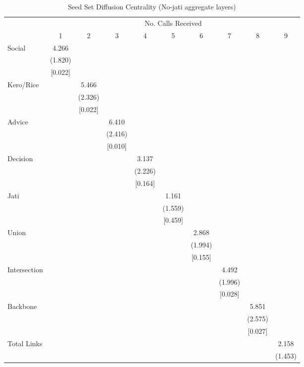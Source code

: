\begin{table}
\centering
\caption{Seed Set Diffusion Centrality (No-jati aggregate layers)}
\centering
\begin{tabular}[t]{lccccccccc}
\toprule
\multicolumn{1}{c}{ } & \multicolumn{9}{c}{No. Calls Received} \\
\cmidrule(l{3pt}r{3pt}){2-10}
  & 1 & 2 & 3 & 4 & 5 & 6 & 7 & 8 & 9\\
\midrule
Social & \num{4.266} &  &  &  &  &  &  &  & \\
 & (\num{1.820}) &  &  &  &  &  &  &  & \\
 & {}[\num{0.022}] &  &  &  &  &  &  &  & \\
Kero/Rice &  & \num{5.466} &  &  &  &  &  &  & \\
 &  & (\num{2.326}) &  &  &  &  &  &  & \\
 &  & {}[\num{0.022}] &  &  &  &  &  &  & \\
Advice &  &  & \num{6.410} &  &  &  &  &  & \\
 &  &  & (\num{2.416}) &  &  &  &  &  & \\
 &  &  & {}[\num{0.010}] &  &  &  &  &  & \\
Decision &  &  &  & \num{3.137} &  &  &  &  & \\
 &  &  &  & (\num{2.226}) &  &  &  &  & \\
 &  &  &  & {}[\num{0.164}] &  &  &  &  & \\
Jati &  &  &  &  & \num{1.161} &  &  &  & \\
 &  &  &  &  & (\num{1.559}) &  &  &  & \\
 &  &  &  &  & {}[\num{0.459}] &  &  &  & \\
Union &  &  &  &  &  & \num{2.868} &  &  & \\
 &  &  &  &  &  & (\num{1.994}) &  &  & \\
 &  &  &  &  &  & {}[\num{0.155}] &  &  & \\
Intersection &  &  &  &  &  &  & \num{4.492} &  & \\
 &  &  &  &  &  &  & (\num{1.996}) &  & \\
 &  &  &  &  &  &  & {}[\num{0.028}] &  & \\
Backbone &  &  &  &  &  &  &  & \num{5.851} & \\
 &  &  &  &  &  &  &  & (\num{2.575}) & \\
 &  &  &  &  &  &  &  & {}[\num{0.027}] & \\
Total Links &  &  &  &  &  &  &  &  & \num{2.158}\\
 &  &  &  &  &  &  &  &  & (\num{1.453})\\

\end{tabular}
\end{table}
